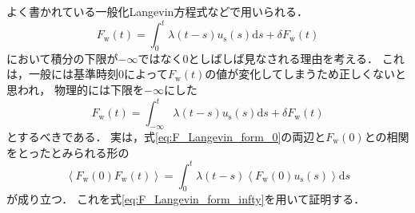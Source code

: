 \documentclass[10pt, dvipdfmx]{jarticle}
\newcommand{\la}{\left <}
\newcommand{\ra}{\right >}
\begin{document}
よく書かれている一般化Langevin方程式などで用いられる．
\begin{equation}\label{eq:F_Langevin_form_0}
    F_\text{w}(t) = \int_0^t \lambda(t-s) u_\text{s}(s) \text{d} s + \delta F_\text{w}(t)
\end{equation}
において積分の下限が$-\infty$ではなく$0$としばしば見なされる理由を考える．
これは，一般には基準時刻$0$によって$F_\text{w}(t)$の値が変化してしまうため正しくないと思われ，
物理的には下限を$-\infty$にした
\begin{equation}\label{eq:F_Langevin_form_infty}
    F_\text{w}(t) = \int_{-\infty}^t \lambda(t-s) u_\text{s}(s) \text{d} s + \delta F_\text{w}(t)
\end{equation}
とするべきである．
実は，式\eqref{eq:F_Langevin_form_0}の両辺と$F_\text{w}(0)$との相関をとったとみられる形の
\begin{equation}\label{eq:F_cor_Langevin_form_0}
    \la F_\text{w}(0) F_\text{w}(t) \ra = \int_0^t \lambda(t-s) \la F_\text{w}(0) u_\text{s}(s) \ra \text{d} s
\end{equation}
が成り立つ．
これを式\eqref{eq:F_Langevin_form_infty}を用いて証明する．
\end{document}
